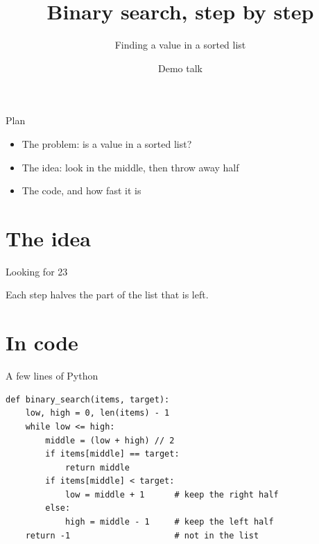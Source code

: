 \documentclass[aspectratio=169]{beamer}
\title{Binary search, step by step}
\subtitle{Finding a value in a sorted list}
\author{Demo talk}
\date{}
\newcommand{\cells}[1]{%
  \foreach \v [count=\i from 0] in {3,8,12,17,23,31,42,56} {
    \node[draw, minimum width=1.1cm, minimum height=0.9cm, fill=#1] (c\i) at (\i*1.2,0) {\v};
  }}
\begin{document}
\maketitle

\begin{frame}{Plan}
  \begin{itemize}
    \item<1-> The problem: is a value in a sorted list?
    \item<2-> The idea: look in the middle, then throw away half
    \item<3-> The code, and how fast it is
  \end{itemize}
\end{frame}

\section{The idea}

\begin{frame}{Looking for 23}
  \centering
  \vspace{1em}

  Each step halves the part of the list that is left.
\end{frame}

\section{In code}

\begin{frame}[fragile]{A few lines of Python}
\begin{lstlisting}
def binary_search(items, target):
    low, high = 0, len(items) - 1
    while low <= high:
        middle = (low + high) // 2
        if items[middle] == target:
            return middle
        if items[middle] < target:
            low = middle + 1      # keep the right half
        else:
            high = middle - 1     # keep the left half
    return -1                     # not in the list
\end{lstlisting}
\end{frame}
\end{document}
